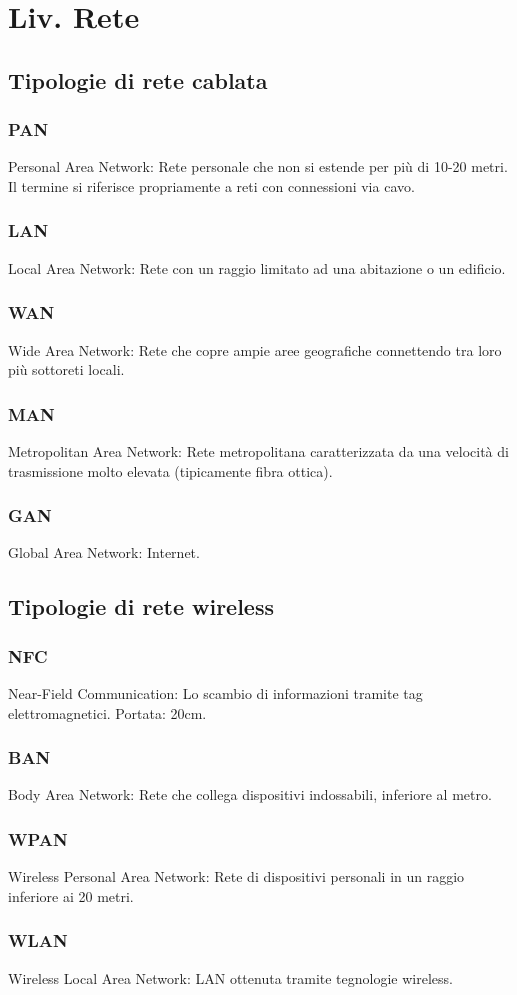 \documentclass[a4paper,11pt]{article}
\def\subsub#1{\subsubsection{#1}\label{#1}}
\begin{document}
\newpage


\section{Liv. Rete}
\subsection{Tipologie di rete cablata}
\subsub{PAN} Personal Area Network: Rete personale che non si estende per più di 10-20 metri. Il termine si riferisce propriamente a reti con connessioni via cavo.
\subsub{LAN} Local Area Network: Rete con un raggio limitato ad una abitazione o un edificio.
\subsub{WAN} Wide Area Network: Rete che copre ampie aree geografiche connettendo tra loro più sottoreti locali. 
\subsub{MAN} Metropolitan Area Network: Rete metropolitana caratterizzata da una velocità di trasmissione molto elevata (tipicamente fibra ottica).
\subsub{GAN} Global Area Network: Internet.
\subsection{Tipologie di rete wireless}
\subsub{NFC} Near-Field Communication: Lo scambio di informazioni tramite tag elettromagnetici. Portata: 20cm.
\subsub{BAN} Body Area Network: Rete che collega dispositivi indossabili, inferiore al metro.
\subsub{WPAN} Wireless Personal Area Network: Rete di dispositivi personali in un raggio inferiore ai 20 metri.
\subsub{WLAN} Wireless Local Area Network: LAN ottenuta tramite tegnologie wireless. 
\end{document}
